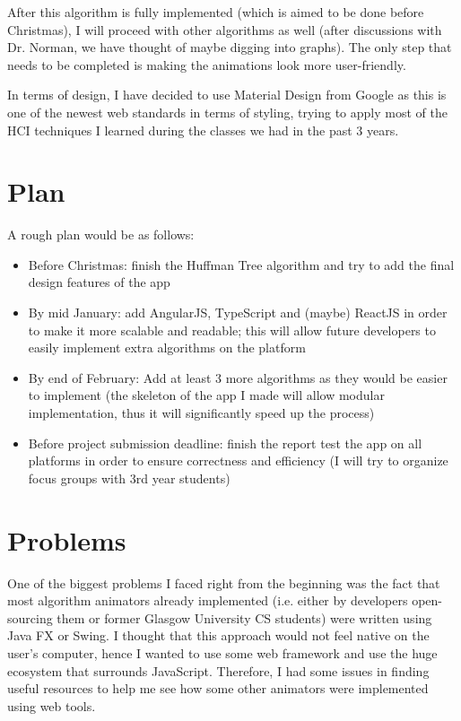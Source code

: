 \documentclass[11pt]{article}
\begin{document}
 After this algorithm is fully implemented (which is aimed to be done before Christmas), I will proceed with other algorithms as well (after discussions with Dr. Norman, we have thought of maybe digging into graphs). The only step that needs to be completed is making the animations look more user-friendly.
 
 In terms of design, I have decided to use Material Design from Google as this is one of the newest web standards in terms of styling, trying to apply most of the HCI techniques I learned during the classes we had in the past 3 years.
 
 \section{Plan}
 A rough plan would be as follows:
 \begin{itemize}
 	\item Before Christmas: finish the Huffman Tree algorithm and try to add the final design features of the app
 	\item By mid January: add AngularJS, TypeScript and (maybe) ReactJS in order to make it more scalable and readable; this will allow future developers to easily implement extra algorithms on the platform
 	\item By end of February: Add at least 3 more algorithms as they would be easier to implement (the skeleton of the app I made will allow modular implementation, thus it will significantly speed up the process)
 	\item Before project submission deadline: finish the report test the app on all platforms in order to ensure correctness and efficiency (I will try to organize focus groups with 3rd year students)
 \end{itemize}
 
\section{Problems}
One of the biggest problems I faced right from the beginning was the fact that most algorithm animators already implemented (i.e. either by developers open-sourcing them or former Glasgow University CS students) were written using Java FX or Swing. I thought that this approach would not feel native on the user's computer, hence I wanted to use some web framework and use the huge ecosystem that surrounds JavaScript. Therefore, I had some issues in finding useful resources to help me see how some other animators were implemented using web tools.
\end{document}
